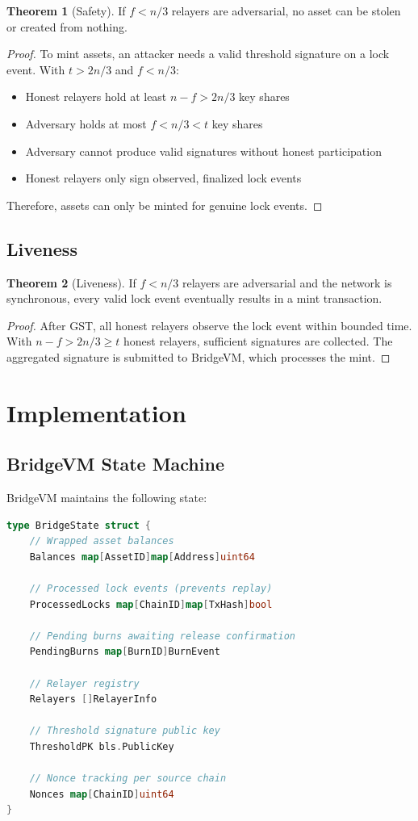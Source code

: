 \documentclass[11pt,a4paper]{article}
\theoremstyle{definition}
\newtheorem{theorem}{Theorem}
\begin{document}
\begin{theorem}[Safety]
If $f < n/3$ relayers are adversarial, no asset can be stolen or created from nothing.
\end{theorem}

\begin{proof}
To mint assets, an attacker needs a valid threshold signature on a lock event. With $t > 2n/3$ and $f < n/3$:
\begin{itemize}
    \item Honest relayers hold at least $n - f > 2n/3$ key shares
    \item Adversary holds at most $f < n/3 < t$ key shares
    \item Adversary cannot produce valid signatures without honest participation
    \item Honest relayers only sign observed, finalized lock events
\end{itemize}
Therefore, assets can only be minted for genuine lock events.
\end{proof}

\subsection{Liveness}

\begin{theorem}[Liveness]
If $f < n/3$ relayers are adversarial and the network is synchronous, every valid lock event eventually results in a mint transaction.
\end{theorem}

\begin{proof}
After GST, all honest relayers observe the lock event within bounded time. With $n - f > 2n/3 \geq t$ honest relayers, sufficient signatures are collected. The aggregated signature is submitted to BridgeVM, which processes the mint.
\end{proof}

\section{Implementation}

\subsection{BridgeVM State Machine}

BridgeVM maintains the following state:

\begin{lstlisting}[language=Go]
type BridgeState struct {
    // Wrapped asset balances
    Balances map[AssetID]map[Address]uint64

    // Processed lock events (prevents replay)
    ProcessedLocks map[ChainID]map[TxHash]bool

    // Pending burns awaiting release confirmation
    PendingBurns map[BurnID]BurnEvent

    // Relayer registry
    Relayers []RelayerInfo

    // Threshold signature public key
    ThresholdPK bls.PublicKey

    // Nonce tracking per source chain
    Nonces map[ChainID]uint64
}
\end{lstlisting}
\end{document}
